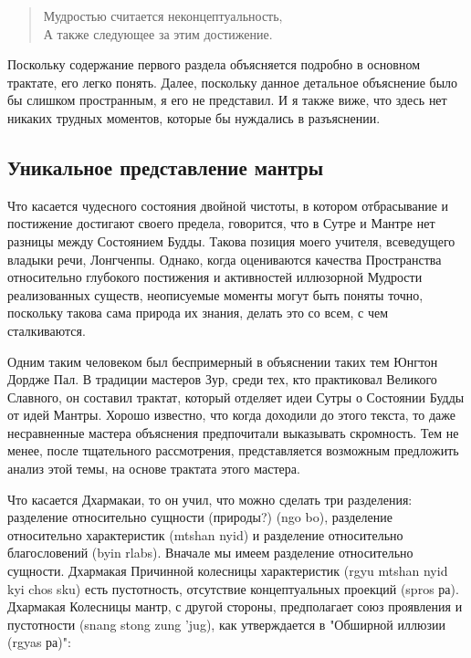 \begin{verse}
Мудростью считается неконцептуальность,\\
А также следующее за этим достижение.\\
\end{verse}

\begin{siderules}
Поскольку содержание первого раздела объясняется подробно в основном трактате, его
легко понять. Далее, поскольку данное детальное объяснение было бы слишком
пространным, я его не представил. И я также виже, что здесь нет никаких трудных моментов,
которые бы нуждались в разъяснении.
\end{siderules}

\subsection{Уникальное представление мантры}

Что касается чудесного состояния двойной чистоты, в котором отбрасывание и
постижение достигают своего предела, говорится, что в Сутре и Мантре нет разницы между
Состоянием Будды. Такова позиция моего учителя, всеведущего владыки речи, Лонгченпы.
Однако, когда оцениваются качества Пространства относительно глубокого постижения и
активностей иллюзорной Мудрости реализованных существ, неописуемые моменты могут
быть поняты точно, поскольку такова сама природа их знания, делать это со всем, с чем
сталкиваются.

Одним таким человеком был беспримерный в объяснении таких тем Юнгтон Дордже
Пал. В традиции мастеров Зур, среди тех, кто практиковал Великого Славного, он составил
трактат, который отделяет идеи Сутры о Состоянии Будды от идей Мантры. Хорошо
известно, что когда доходили до этого текста, то даже несравненные мастера объяснения
предпочитали выказывать скромность. Тем не менее, после тщательного рассмотрения,
представляется возможным предложить анализ этой темы, на основе трактата этого мастера.

Что касается Дхармакаи, то он учил, что можно сделать три разделения: разделение
относительно сущности (природы?) (ngo bo), разделение относительно характеристик
(mtshan nyid) и разделение относительно благословений (byin rlabs). Вначале мы имеем
разделение относительно сущности. Дхармакая Причинной колесницы характеристик (rgyu
mtshan nyid kyi chos sku) есть пустотность, отсутствие концептуальных проекций (spros ра).
Дхармакая Колесницы мантр, с другой стороны, предполагает союз проявления и
пустотности (snang stong zung 'jug), как утверждается в "Обширной иллюзии (rgyas ра)":

